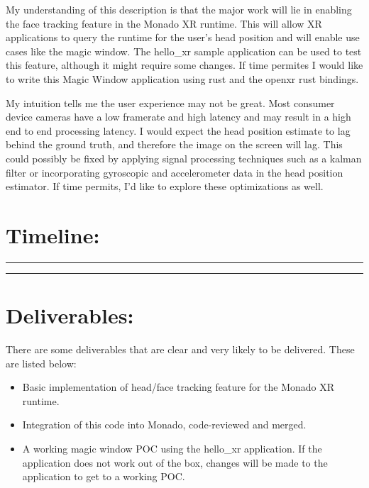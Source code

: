 \begin{normalsize}
\begin{quote}
\end{quote}

My understanding of this description is that the major work will lie in enabling
the face tracking feature in the Monado XR runtime. This will allow XR
applications to query the runtime for the user's head position and will enable use
cases like the magic window. The hello\_xr sample application can be used to test
this feature, although it might require some changes. If time permites I would
like to write this Magic Window application using rust and the openxr rust
bindings.

My intuition tells me the user experience may not be great. Most consumer device
cameras have a low framerate and high latency and may result in a high end to end
processing latency. I would expect the head position estimate to lag behind the
ground truth, and therefore the image on the screen will lag. This could possibly
be fixed by applying signal processing techniques such as a kalman filter or
incorporating gyroscopic and accelerometer data in the head position estimator. If
time permits, I'd like to explore these optimizations as well.

\section{Timeline:}

\begin{table}[H]
\centering
\begin{minipage}[t]{.7\linewidth}
\rule{\linewidth}{1pt}
\bigskip
\rule{\linewidth}{1pt}%
\end{minipage}%
\end{table}

\section{Deliverables:}

There are some deliverables that are clear and very likely to be delivered. These
are listed below:

\begin{itemize}
\item Basic implementation of head/face tracking feature for the Monado XR runtime.
\item Integration of this code into Monado, code-reviewed and merged.
\item A working magic window POC using the hello\_xr application. If the
application does not work out of the box, changes will be made to the application
to get to a working POC.
\end{itemize}


\end{normalsize}
